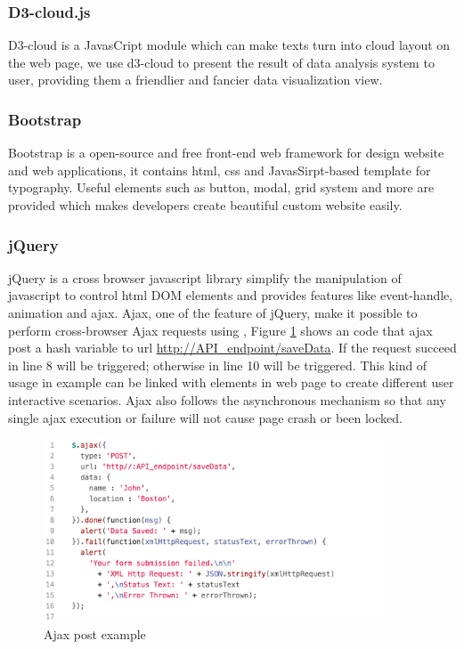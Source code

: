 \subsubsection{D3-cloud.js}
D3-cloud \cite{d3cloud} is a JavasCript module which can make texts turn into cloud layout on the web page, we use d3-cloud to present the result of data analysis system to user, providing them a friendlier and fancier data visualization view.

\subsubsection{Bootstrap}
Bootstrap\cite{bootstrap} is a open-source and free front-end web framework for design website and web applications, it contains html, css and JavasSirpt-based template for typography.
Useful elements such as button, modal, grid system and more are provided which makes developers create beautiful custom website easily.

\subsubsection{jQuery}
jQuery is a \cite{jquery} cross browser javascript library simplify the manipulation of javascript to control html DOM elements and provides features like event-handle, animation and ajax.
Ajax, one of the feature of jQuery, make it possible to perform cross-browser Ajax requests using , Figure \ref{fig:ajaxpost} shows an code that ajax post a hash variable  to url \url{http://API_endpoint/saveData}.
If the request succeed  in line 8 will be triggered; otherwise  in line 10 will be triggered.
This kind of usage in example can be linked with elements in web page to create different user interactive scenarios.
Ajax also follows the asynchronous mechanism so that any single ajax execution or failure will not cause page crash or been locked.

\begin{figure}[H]
    \centering
    \includegraphics[width = 0.9\textwidth]{fig/ajax-example.png}
    \caption{Ajax post example}
    \label{fig:ajaxpost}
\end{figure}

